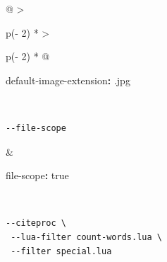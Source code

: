 \documentclass[
  b5paper
]{book}
\newenvironment{Shaded}{}{}
\newcommand{\AttributeTok}[1]{\textcolor[rgb]{0.49,0.56,0.16}{#1}}
\newcommand{\CharTok}[1]{\textcolor[rgb]{0.25,0.44,0.63}{#1}}
\newcommand{\FunctionTok}[1]{\textcolor[rgb]{0.02,0.16,0.49}{#1}}
\newcommand{\KeywordTok}[1]{\textcolor[rgb]{0.00,0.44,0.13}{\textbf{#1}}}
\newcommand{\StringTok}[1]{\textcolor[rgb]{0.25,0.44,0.63}{#1}}
\begin{document}
\begin{longtable}[]{@{}
  >{\raggedright\arraybackslash}p{(\columnwidth - 2\tabcolsep) * }
  >{\raggedright\arraybackslash}p{(\columnwidth - 2\tabcolsep) * }@{}}
\begin{minipage}[t]{\linewidth}
\begin{Shaded}
\begin{Highlighting}[]
\FunctionTok{default{-}image{-}extension}\KeywordTok{:}\AttributeTok{ }\StringTok{\textquotesingle{}.jpg\textquotesingle{}}
\end{Highlighting}
\end{Shaded}
\end{minipage} \\
\begin{minipage}[t]{\linewidth}\raggedright
\begin{verbatim}
--file-scope
\end{verbatim}
\end{minipage} & \begin{minipage}[t]{\linewidth}\raggedright
\begin{Shaded}
\begin{Highlighting}[]
\FunctionTok{file{-}scope}\KeywordTok{:}\AttributeTok{ }\CharTok{true}
\end{Highlighting}
\end{Shaded}
\end{minipage} \\
\begin{minipage}[t]{\linewidth}\raggedright
\begin{verbatim}
--citeproc \
 --lua-filter count-words.lua \
 --filter special.lua


\end{verbatim}
\end{minipage}
\end{longtable}
\end{document}
